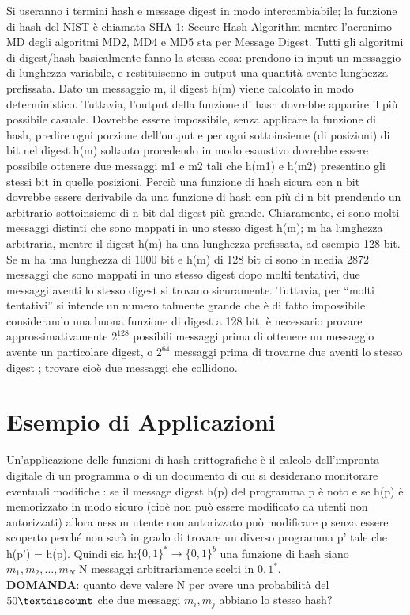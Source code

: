 Si useranno i termini hash e message digest in modo intercambiabile; la funzione di hash del NIST è chiamata SHA-1: Secure Hash Algorithm mentre l’acronimo MD degli algoritmi MD2, MD4 e MD5 sta per Message Digest. Tutti gli algoritmi di digest/hash basicalmente fanno la stessa cosa: prendono in input un messaggio di lunghezza variabile, e restituiscono in output una quantità avente lunghezza prefissata.
Dato un messaggio m, il digest h(m) viene calcolato in modo deterministico. Tuttavia, l’output della funzione di hash dovrebbe apparire il più possibile casuale. Dovrebbe essere impossibile, senza applicare la funzione di
hash, predire ogni porzione dell’output e per ogni sottoinsieme (di posizioni) di bit nel digest h(m)
soltanto procedendo in modo esaustivo dovrebbe essere possibile ottenere due messaggi m1 e m2 tali che h(m1) e
h(m2) presentino gli stessi bit in quelle posizioni.
Perciò una funzione di hash sicura con n bit dovrebbe essere derivabile da una funzione di hash con più di n
bit prendendo un arbitrario sottoinsieme di n bit dal digest più grande.
Chiaramente, ci sono molti messaggi distinti che sono mappati in uno stesso digest h(m); m ha lunghezza arbitraria, mentre il digest h(m) ha una lunghezza prefissata, ad esempio 128 bit.
Se m ha una lunghezza di 1000 bit e h(m) di 128 bit ci sono in media 2872 messaggi che sono mappati in uno
stesso digest  dopo molti tentativi, due messaggi aventi lo stesso digest si trovano sicuramente.
Tuttavia, per “molti tentativi” si intende un numero talmente grande che è di fatto impossibile
considerando una buona funzione di digest a 128 bit, è necessario provare approssimativamente
$2^{128}$ possibili messaggi prima di ottenere un messaggio avente un particolare digest, o
$2^{64}$ messaggi prima di trovarne due aventi lo stesso digest ; trovare cioè due messaggi che collidono.

\section{Esempio di Applicazioni}
Un’applicazione delle funzioni di hash crittografiche è il calcolo dell’impronta digitale di
un programma o di un documento di cui si desiderano monitorare eventuali modifiche :
se il message digest h(p) del programma p è noto e se h(p) è memorizzato in modo sicuro (cioè non può essere
modificato da utenti non autorizzati) allora nessun utente non autorizzato può modificare p
senza essere scoperto perché non sarà in grado di trovare un diverso programma p’ tale che h(p’) = h(p).
Quindi sia h:$\{0, 1\}^{*} → \{0, 1\}^{b}$ una funzione di hash siano $m_{1}, m_{2}, …, m_{N}$ N messaggi arbitrariamente
scelti in ${0, 1}^{*}$. \\
\textbf{DOMANDA}: quanto deve valere N per avere una probabilità del $50\textdiscount$ che due messaggi $m_{i}, m_{j}$ abbiano lo stesso hash?

